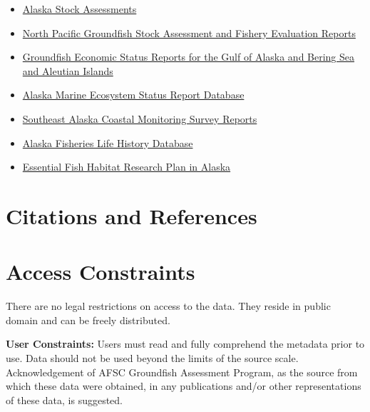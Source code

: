 \documentclass[
  letterpaper,
  oneside,
  open=any]{scrbook}
\providecommand{\tightlist}{%
  \setlength{\itemsep}{0pt}\setlength{\parskip}{0pt}}\usepackage{longtable,booktabs,array}
\begin{document}
\begin{itemize}
\tightlist
\item
  \href{https://www.fisheries.noaa.gov/alaska/population-assessments/alaska-stock-assessments}{Alaska
  Stock Assessments}
\item
  \href{https://www.fisheries.noaa.gov/alaska/population-assessments/north-pacific-groundfish-stock-assessment-and-fishery-evaluation}{North
  Pacific Groundfish Stock Assessment and Fishery Evaluation Reports}
\item
  \href{https://www.fisheries.noaa.gov/alaska/commercial-fishing/groundfish-economic-status-reports-gulf-alaska-and-bering-sea-and-aleutian-islands}{Groundfish
  Economic Status Reports for the Gulf of Alaska and Bering Sea and
  Aleutian Islands}
\item
  \href{https://www.fisheries.noaa.gov/resource/data/alaska-marine-ecosystem-status-report-archive}{Alaska
  Marine Ecosystem Status Report Database}
\item
  \href{https://www.fisheries.noaa.gov/alaska/commercial-fishing/southeast-alaska-coastal-monitoring-survey-reports}{Southeast
  Alaska Coastal Monitoring Survey Reports}
\item
  \href{https://www.fisheries.noaa.gov/resource/data/alaska-fisheries-life-history-database}{Alaska
  Fisheries Life History Database}
\item
  \href{https://www.fisheries.noaa.gov/alaska/habitat-conservation/essential-fish-habitat-research-plan-alaska}{Essential
  Fish Habitat Research Plan in Alaska}
\end{itemize}

\chapter{Citations and References}\label{citations-and-references}

\chapter{Access Constraints}\label{access-constraints-2}

There are no legal restrictions on access to the data. They reside in
public domain and can be freely distributed.

\textbf{User Constraints:} Users must read and fully comprehend the
metadata prior to use. Data should not be used beyond the limits of the
source scale. Acknowledgement of AFSC Groundfish Assessment Program, as
the source from which these data were obtained, in any publications
and/or other representations of these data, is suggested.
\end{document}
